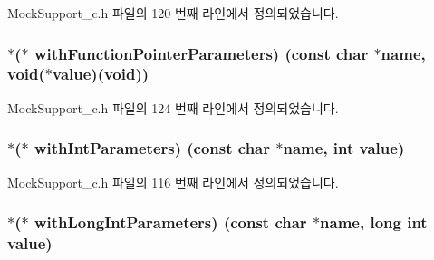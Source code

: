 Mock\+Support\+\_\+c.\+h 파일의 120 번째 라인에서 정의되었습니다.

\subsubsection[{\texorpdfstring{with\+Function\+Pointer\+Parameters}{withFunctionPointerParameters}}]{$\ast$($\ast$ with\+Function\+Pointer\+Parameters) (const char $\ast$name, void($\ast$value)(void))}\hypertarget{struct_s_mock_expected_call__c_af65ebee814b7e3d708f53c6fe2675db7}{}\label{struct_s_mock_expected_call__c_af65ebee814b7e3d708f53c6fe2675db7}


Mock\+Support\+\_\+c.\+h 파일의 124 번째 라인에서 정의되었습니다.

\subsubsection[{\texorpdfstring{with\+Int\+Parameters}{withIntParameters}}]{$\ast$($\ast$ with\+Int\+Parameters) (const char $\ast$name, int value)}\hypertarget{struct_s_mock_expected_call__c_aa549ae5b7c879a348202d8f120203996}{}\label{struct_s_mock_expected_call__c_aa549ae5b7c879a348202d8f120203996}


Mock\+Support\+\_\+c.\+h 파일의 116 번째 라인에서 정의되었습니다.

\subsubsection[{\texorpdfstring{with\+Long\+Int\+Parameters}{withLongIntParameters}}]{$\ast$($\ast$ with\+Long\+Int\+Parameters) (const char $\ast$name, long int value)}\hypertarget{struct_s_mock_expected_call__c_ab139d1115b81c7ec704bd4d56943a9f3}{}\label{struct_s_mock_expected_call__c_ab139d1115b81c7ec704bd4d56943a9f3}



